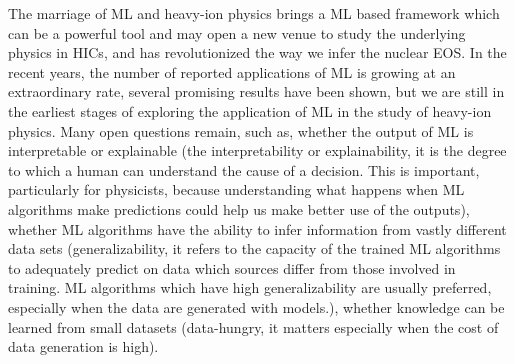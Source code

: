 \documentclass[twocolumn,aps,superscriptaddress]{revtex4}
\begin{document}
The marriage of ML and heavy-ion physics brings a ML based framework which can be a powerful tool and may open a new venue to study the underlying physics in HICs, and has revolutionized the way we infer the nuclear EOS. In the recent years, the number
of reported applications of ML is growing at an extraordinary rate, several promising results have been shown, but we are still in the earliest stages of exploring the application of ML in the study of heavy-ion physics. Many open questions remain, such as, whether the output of ML is interpretable or explainable (the interpretability or explainability, it is the degree to which a human can understand the cause of a decision. This is important, particularly for physicists, because understanding what happens when
ML algorithms make predictions could help us make better
use of the outputs), whether ML algorithms have the ability to infer information from vastly different data sets (generalizability, it refers to the capacity of the trained ML algorithms to adequately predict on data which sources differ from those involved in training. ML algorithms which have high generalizability are usually preferred, especially when the data are generated with models.), whether knowledge can be learned from small datasets (data-hungry, it matters especially when the cost of data generation is high).
\end{document}
